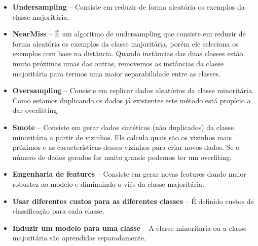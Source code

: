 \documentclass[12pt]{article}
\begin{document}
\begin{itemize}
    \item \textbf{Undersampling} – Consiste em reduzir de forma aleatória os exemplos da classe majoritária.
    \item \textbf{NearMiss} – É um algoritmo de undersampling que consiste em reduzir de forma aleatória os exemplos da classe majoritária, porém ele seleciona os exemplos com base na distância.
    Quando instâncias das duas classes estão muito próximas umas das outras, removemos as instâncias da classe majoritária para termos uma maior separabilidade entre as classes.
    \item \textbf{Oversampling} – Consiste em replicar dados aleatórios da classe minoritária. Como estamos duplicando os dados já existentes este método está propício a dar overfitting.
    \item \textbf{Smote} – Consiste em gerar dados sintéticos (não duplicados) da classe minoritária a partir de vizinhos.
    Ele calcula quais são os vizinhos mais próximos e as características desses vizinhos para criar novos dados. Se o número de dados gerados for muito grande podemos ter um overfiting.
    \item \textbf{Engenharia de features} – Consiste em gerar novas features dando maior robustez ao modelo e diminuindo o viés da classe majoritária.
    \item \textbf{Usar diferentes custos para as diferentes classes} – É definido custos de classificação para cada classe.
    \item \textbf{Induzir um modelo para uma classe} – A classe minoritária ou a classe majoritária são aprendidas separadamente.
\end{itemize}
\end{document}
